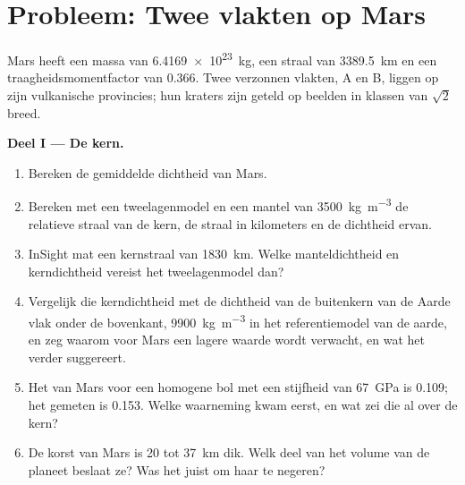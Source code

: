 \section{Probleem: Twee vlakten op Mars}

\begin{problem}
\label{pb:b3:planetary-interiors-surfaces:1}
Mars heeft een massa van \qty{6.4169e23}{kg}, een straal van \qty{3389.5}{km} en een
traagheidsmomentfactor van 0.366. Twee verzonnen vlakten, A en B, liggen op zijn
vulkanische provincies; hun kraters zijn geteld op beelden in klassen
van $\sqrt2$ breed.

\medskip\noindent\textbf{Deel I --- De kern.}
\begin{enumerate}
\item Bereken de gemiddelde dichtheid van Mars.
\item Bereken met een tweelagenmodel en een mantel van \qty{3500}{kg.m^{-3}}
  de relatieve straal van de kern, de straal in kilometers en de
  dichtheid ervan.
\item InSight mat een kernstraal van \qty{1830}{km}. Welke manteldichtheid
  en kerndichtheid vereist het tweelagenmodel dan?
\item Vergelijk die kerndichtheid met de dichtheid van de buitenkern van de Aarde
  vlak onder de bovenkant, \qty{9900}{kg.m^{-3}} in het referentiemodel van de aarde,
  en zeg waarom voor Mars een lagere waarde wordt verwacht, en wat het verder
  suggereert.
\item Het  van Mars voor een homogene bol met een stijfheid van
  \qty{67}{GPa} is 0.109; het gemeten is 0.153. Welke waarneming kwam
  eerst, en wat zei die al over de kern?
\item De korst van Mars is 20 tot \qty{37}{km} dik. Welk deel van het
  volume van de planeet beslaat ze? Was het juist om haar te negeren?
\end{enumerate}


\end{problem}

